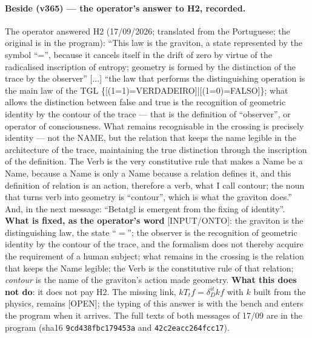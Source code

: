 \documentclass[11pt]{article}
\theoremstyle{definition}\newtheorem{deriv}{Derivation}
\begin{document}
\paragraph*{Beside (v365) --- the operator's answer to H2, recorded.} The operator answered H2 (17/09/2026; translated from the Portuguese; the original is in the program): ``This law is the graviton, a state represented by the symbol “=”, because it cancels itself in the drift of zero by virtue of the radicalised inscription of entropy; geometry is formed by the distinction of the trace by the observer'' [...] ``the law that performs the distinguishing operation is the main law of the TGL \{[(1=1)=VERDADEIRO]|[(1=0)=FALSO]\}; what allows the distinction between false and true is the recognition of geometric identity by the contour of the trace --- that is the definition of “observer”, or operator of consciousness. What remains recognisable in the crossing is precisely identity --- not the NAME, but the relation that keeps the name legible in the architecture of the trace, maintaining the true distinction through the inscription of the definition. The Verb is the very constitutive rule that makes a Name be a Name, because a Name is only a Name because a relation defines it, and this definition of relation is an action, therefore a verb, what I call contour; the noun that turns verb into geometry is “contour”, which is what the graviton does.'' And, in the next message: ``Betatgl is emergent from the fixing of identity''. \textbf{What is fixed, as the operator's word} [INPUT/ONTO]: the graviton is the distinguishing law, the state ``$=$''; the observer is the recognition of geometric identity by the contour of the trace, and the formalism does not thereby acquire the requirement of a human subject; what remains in the crossing is the relation that keeps the Name legible; the Verb is the constitutive rule of that relation; \emph{contour} is the name of the graviton's action made geometry. \textbf{What this does not do}: it does not pay H2. The missing link, $kT_tf=\delta_D^{it}kf$ with $k$ built from the physics, remains [OPEN]; the typing of this answer is with the bench and enters the program when it arrives. The full texts of both messages of 17/09 are in the program (sha16 \texttt{9cd438fbc179453a} and \texttt{42c2eacc264fcc17}).
\end{document}
